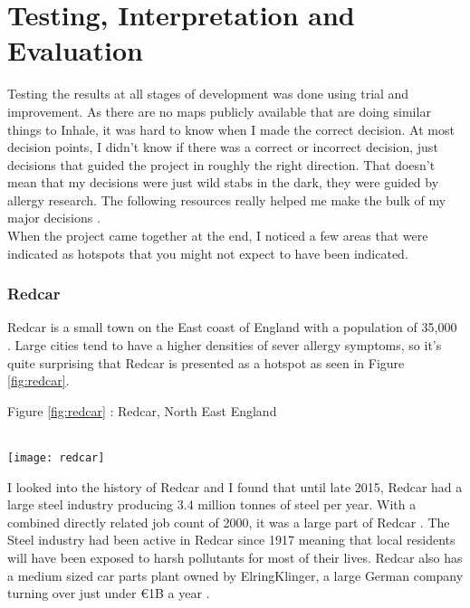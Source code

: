 \chapter{Testing, Interpretation and Evaluation}
\label{cha:tande}
 
Testing the results at all stages of development was done using trial and improvement. As there are no maps publicly available that are doing similar things to Inhale, it was hard to know when I made the correct decision. At most decision points, I didn't know if there was a correct or incorrect decision, just decisions that guided the project in roughly the right direction. That doesn't mean that my decisions were just wild stabs in the dark, they were guided by allergy research. The following resources really helped me make the bulk of my major decisions \cite{childhood, rhinitis, co2pollen, waldo}.\\
 
When the project came together at the end, I noticed a few areas that were indicated as hotspots that you might not expect to have been indicated.

\subsection{Redcar}

Redcar is a small town on the East coast of England with a population of 35,000 \cite{redcarpop}. Large cities tend to have a higher densities of sever allergy symptoms, so it's quite surprising that Redcar is presented as a hotspot as seen in Figure \ref{fig:redcar}.\\

\begin{center}
\caption{Figure \ref{fig:redcar} : Redcar, North East England\label{fig:redcar}}\\
\texttt{[image: redcar]}
\end{center}

I looked into the history of Redcar and I found that until late 2015, Redcar had a large steel industry producing 3.4 million tonnes of steel per year. With a combined directly related job count of 2000, it was a large part of Redcar \cite{bbcredcar}. The Steel industry had been active in Redcar since 1917 meaning that local residents will have been exposed to harsh pollutants for most of their lives. Redcar also has a medium sized car parts plant owned by ElringKlinger, a large German company turning over just under €1B a year \cite{guardez}.\\

